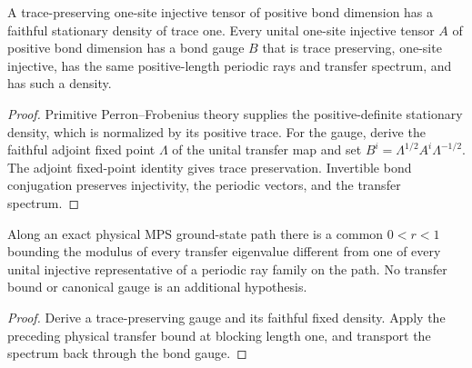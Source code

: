 \begin{lemma}
    \label{lem:spt_injective_tp_gauge}
    \leanok
    A trace-preserving one-site injective tensor of positive bond dimension
    has a faithful stationary density of trace one. Every unital one-site
    injective tensor $A$ of positive bond dimension has a bond gauge $B$
    that is trace preserving, one-site injective, has the same
    positive-length periodic rays and transfer spectrum, and has such a
    density.
\end{lemma}
\begin{proof}\leanok
    Primitive Perron--Frobenius theory supplies the positive-definite
    stationary density, which is normalized by its positive trace.
    For the gauge, derive the faithful adjoint fixed point $\Lambda$ of
    the unital transfer map and set
    $B^i=\Lambda^{1/2}A^i\Lambda^{-1/2}$.
    The adjoint fixed-point identity gives trace preservation. Invertible
    bond conjugation preserves injectivity, the periodic vectors, and
    the transfer spectrum.
\end{proof}

\begin{lemma}
    \label{thm:spt_physical_gap_unital_transfer_bound}
    \leanok
    Along an exact physical MPS ground-state path there is a common
    $0<r<1$ bounding the modulus of every transfer eigenvalue different
    from one of every unital injective representative of a periodic ray
    family on the path. No transfer bound or canonical gauge is an
    additional hypothesis.
\end{lemma}
\begin{proof}\leanok
    Derive a trace-preserving gauge and its faithful fixed density.
    Apply the preceding physical transfer bound at blocking length one,
    and transport the spectrum back through the bond gauge.
\end{proof}

